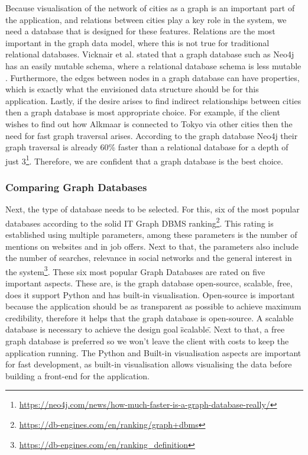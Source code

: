 Because visualisation of the network of cities as a graph is an important part of the application, and relations between cities play a key role in the system, we need a database that is designed for these features. Relations are the most important in the graph data model, where this is not true for traditional relational databases. Vicknair et al. stated that a graph database such as Neo4j has an easily mutable schema, where a relational database schema is less mutable \cite{vicknair2010}. Furthermore, the edges between nodes in a graph database can have properties, which is exactly what the envisioned data structure should be for this application. Lastly, if the desire arises to find indirect relationships between cities then a graph database is most appropriate choice. For example, if the client wishes to find out how Alkmaar is connected to Tokyo via other cities then the need for fast graph traversal arises. According to the graph database Neo4j their graph traversal is already 60\% faster than a relational database for a depth of just 3\footnote{\url{https://neo4j.com/news/how-much-faster-is-a-graph-database-really/}}.  Therefore, we are confident that a graph database is the best choice.

\subsubsection{Comparing Graph Databases}
Next, the type of database needs to be selected. For this, six of the most popular databases according to the solid IT Graph DBMS ranking\footnote{\url{https://db-engines.com/en/ranking/graph+dbms}\label{ranking}}.  This rating is established using multiple parameters, among these parameters is the number of mentions on websites and in job offers. Next to that, the parameters also include the number of searches, relevance in social networks and the general interest in the system\footnote{\url{https://db-engines.com/en/ranking_definition}}. These six most popular Graph Databases are rated on five important aspects. These are, is the graph database open-source, scalable, free, does it support Python and has built-in visualisation. Open-source is important because the application should be as transparent as possible to achieve maximum credibility, therefore it helps that the graph database is open-source. A scalable database is necessary to achieve the design goal \"scalable\". Next to that, a free graph database is preferred so we won't leave the client with costs to keep the application running. The Python and Built-in visualisation aspects are important for fast development, as built-in visualisation allows visualising the data before building a front-end for the application.


